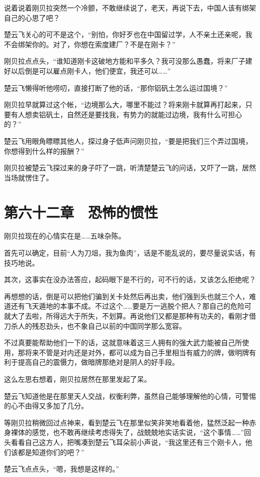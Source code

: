 说着说着刚贝拉突然一个冷颤，不敢继续说了，老天，再说下去，中国人该有绑架自己的心思了吧？

楚云飞关心的可不是这个，“别怕，你好歹也在中国留过学，人不亲土还亲呢，我不会绑架你的。对了，你想在索度建厂？不是在刚卡？”

刚贝拉点点头，“谁知道刚卡这破地方能和平多久？我可没那么愚蠢，将来厂子建好以后倒是可以雇点刚卡人，他们便宜，我还可以……”

楚云飞懒得听他唠叨，直接打断了他的话，“那你铝矾土怎么运过国境？”

刚贝拉早就算过这个帐，“边境那么大，哪里不能过？将来刚卡就算再打起来，只要有人想卖铝矾土，自然还是要找我，有势力的就能过边境，我有什么可担心的？”

楚云飞用眼角瞟瞟其他人，探过身子低声问刚贝拉，“要是把我们三个弄过国境，你想得到什么样的报酬？”

刚贝拉被楚云飞探过来的身子吓了一跳，听清楚楚云飞的问话，又吓了一跳，居然当场就愣住了。

\section{第六十二章　恐怖的惯性}

刚贝拉现在的心情实在是……五味杂陈。

首先可以确定，目前“人为刀俎，我为鱼肉”，话是不能乱说的，要尽量说实话，有技巧地说。

其次，这事实在没办法答应，起码眼下是不行的，可不行的话，又该怎么拒绝呢？

再想想的话，倒是可以把他们骗到关卡处然后再出卖，他们强到头也就三个人，难道还有飞天遁地的本事不成。不过这个……要是万一逃脱个把人？那自己的危险可就大了去啦，所得远大于所失，不划算。再说他们又都是那种有功夫的，看刚才借刀杀人的残忍劲头，也不象自己以前的中国同学那么宽容。

不过真要能帮助他们一下的话，这就意味着这三人拥有的强大武力能被自己所使用，那将来不管是对内还是对外，都可以成为自己手里相当有威力的牌，做明牌有利于提高自己的震慑力，做暗牌那绝对是阴人的好手段。

这么左思右想着，刚贝拉居然在那里发起了呆。

楚云飞知道他是在那里天人交战，权衡利弊，虽然自己能够理解他的心情，可警惕的心不由得又多加了几分。

等刚贝拉稍微回过点神来，看到楚云飞在那里似笑非笑地看着他，猛然泛起一种赤身裸体的感觉，也不敢再继续考虑得失了，战兢兢地实话实说，“这个事情……”回头看看自己这方人，把嘴凑到楚云飞耳朵前小声说，“我这里还有三个刚卡人，他们该都是知道你们的吧？”

楚云飞点点头，“嗯，我想是这样的。”

